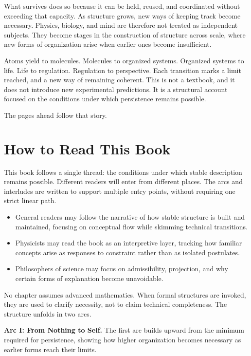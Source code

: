 \documentclass[11pt,twoside,openright]{book}
\begin{document}
What survives does so because it can be held, reused, and coordinated without exceeding that capacity. As structure grows, new ways of keeping track become necessary. Physics, biology, and mind are therefore not treated as independent subjects. They become stages in the construction of structure across scale, where new forms of organization arise when earlier ones become insufficient.

Atoms yield to molecules. Molecules to organized systems. Organized systems to life. Life to regulation. Regulation to perspective. Each transition marks a limit reached, and a new way of remaining coherent. This is not a textbook, and it does not introduce new experimental predictions. It is a structural account focused on the conditions under which persistence remains possible.

The pages ahead follow that story.

\cleardoublepage
\chapter*{How to Read This Book}

This book follows a single thread: the conditions under which stable description remains possible. Different readers will enter from different places. The arcs and interludes are written to support multiple entry points, without requiring one strict linear path.

\begin{itemize}
\item General readers may follow the narrative of how stable structure is built and maintained,
focusing on conceptual flow while skimming technical transitions.

\item Physicists may read the book as an interpretive layer,
tracking how familiar concepts arise as responses to constraint rather than as isolated postulates.

\item Philosophers of science may focus on admissibility, projection,
and why certain forms of explanation become unavoidable.
\end{itemize}

No chapter assumes advanced mathematics. When formal structures are invoked, they are used to clarify necessity, not to claim technical completeness. The structure unfolds in two arcs.

\medskip

\textbf{Arc I: From Nothing to Self.}
The first arc builds upward from the minimum required for persistence,
showing how higher organization becomes necessary
as earlier forms reach their limits.
\end{document}
